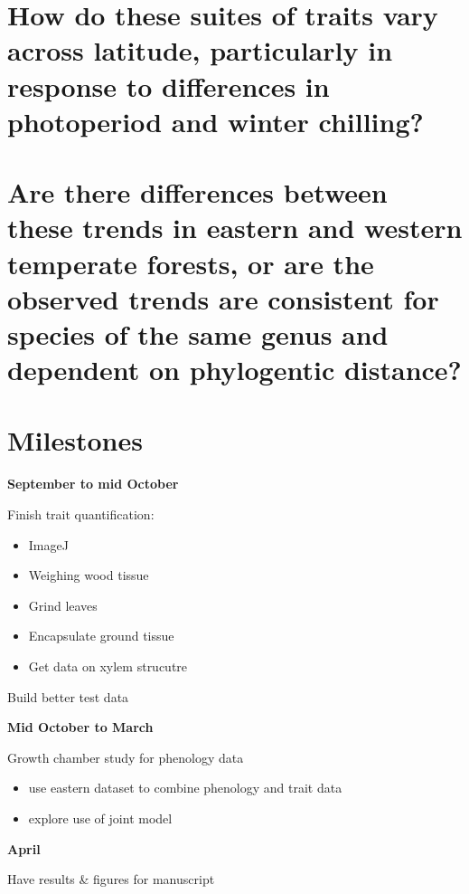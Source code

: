 \documentclass{article}\usepackage[]{graphicx}\usepackage[]{color}
\begin{document}
\section*{How do these suites of traits vary across latitude, particularly in response to differences in photoperiod and winter chilling?}
\par %

\section*{Are there differences between these trends in eastern and western temperate forests, or are the observed trends are consistent for species of the same genus and dependent on phylogentic distance?}
\par %

\section*{Milestones}

\textbf{September to mid October}
\par Finish trait quantification:
\begin{itemize}
\item ImageJ
\item Weighing wood tissue
\item Grind leaves
\item Encapsulate ground tissue
\item Get data on xylem strucutre 
\end{itemize}
Build better test data

\textbf{Mid October to March}
\par Growth chamber study for phenology data
\begin{itemize}
\item use eastern dataset to combine phenology and trait data
\item explore use of joint model
\end{itemize}

\textbf{April}
\par Have results & figures for manuscript

% 


\end{document}
